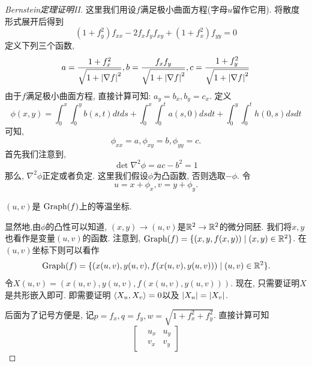 \begin{proof}[Bernstein定理证明II]
    这里我们用设$f$满足极小曲面方程(字母$u$留作它用). 将散度形式展开后得到
    \begin{equation}
        (1+f_y^2)f_{xx}-2f_xf_yf_{xy}+(1+f_x^2)f_{yy}=0
    \end{equation}
    定义下列三个函数, 
    \begin{equation}
        a=\frac{1+f_x^2}{\sqrt{1+\left | \nabla f \right |^2}},
        b=\frac{f_xf_y}{\sqrt{1+\left | \nabla f \right |^2}},
        c=\frac{1+f_y^2}{\sqrt{1+\left | \nabla f \right |^2}}
    \end{equation}
    由于$f$满足极小曲面方程, 直接计算可知: $a_y=b_x, b_y=c_x$.
    定义
    \begin{equation}
        \phi(x,y)=\int^x_0\int^y_0 b(s,t)dtds+\int^x_0\int^t_0a(s,0)dsdt+\int^y_0\int^t_0h(0,s)dsdt
    \end{equation}
    可知, 
    \begin{equation}
        \phi_{xx}=a, \phi_{xy}=b, \phi_{yy}=c.
    \end{equation}
    首先我们注意到, 
    \begin{equation}
        \det \nabla^2 \phi= ac-b^2 =1
    \end{equation}
    那么,  $\nabla^2 \phi$正定或者负定. 这里我们假设$\phi$为凸函数, 否则选取$-\phi$.  令
    \begin{equation}
        u=x+\phi_x, v=y+\phi_y.
    \end{equation}
    \begin{claim}
        $(u,v)$是 $\text{Graph}(f)$上的等温坐标.
    \end{claim}
    显然地,由$\phi$的凸性可以知道, $(x,y)\to (u,v)$是$\mathbb{R}^2 \to \mathbb{R}^2$的微分同胚.  我们将$x,y$也看作是变量$(u,v)$的函数. 注意到, $\text{Graph}(f)=\{(x,y,f(x,y))\mid (x,y) \in \mathbb{R}^2\}$. 在$(u,v)$坐标下则可以看作
    \begin{equation}
        \text{Graph}(f)=\{(x(u,v), y(u,v), f(x(u,v), y(u,v)))\mid (u,v) \in \mathbb{R}^2\}.
    \end{equation}
    令$X(u,v)= (x(u,v), y(u,v), f(x(u,v), y(u,v)))$. 现在, 只需要证明$X$是共形嵌入即可. 即需要证明 ${\left < X_u, X_v \right >}=0$以及 $\left | X_u \right |=\left | X_v \right |$.
    \par 后面为了记号方便是, 记$p=f_x, q=f_y, w=\sqrt{1+f_x^2+f_y^2}$. 直接计算可知
    \begin{equation}
        \begin{bmatrix}
            &u_x &u_y \\
            &v_x &v_y
        \end{bmatrix}

\end{equation}
\end{proof}
